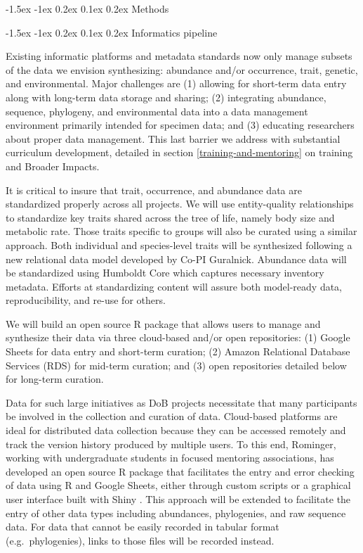 \documentclass[11pt]{article}
\makeatletter
\renewcommand\subsection{\@startsection{subsection}{1}{\z@}%
                                  {-1.5ex \@plus -1ex \@minus 0.2ex}%
                                  {0.1ex \@plus 0.2ex}%
                                  {\normalfont\large\bfseries}}
\renewcommand\subsubsection{\@startsection{subsection}{1}{\z@}%
                                  {-1.5ex \@plus -1ex \@minus 0.2ex}%
                                  {0.1ex \@plus 0.2ex}%
                                  {\normalfont\bfseries}}
\makeatother
\begin{document}
\subsection{Methods}\label{methods}

\subsubsection{Informatics pipeline}\label{informatics-pipeline}

Existing informatic platforms and metadata standards now only manage
subsets of the data we envision synthesizing: abundance and/or
occurrence, trait, genetic, and environmental. Major challenges are
(1) allowing for short-term data entry along with long-term data
storage and sharing; (2) integrating abundance, sequence, phylogeny,
and environmental data into a data management environment primarily
intended for specimen data; and (3) educating researchers about proper
data management. This last barrier we address with substantial
curriculum development, detailed in section
\ref{training-and-mentoring} on training and Broader Impacts.

It is critical to insure that trait, occurrence, and abundance data
are standardized properly across all projects. We will use
entity-quality relationships to standardize key traits shared across
the tree of life, namely body size and metabolic rate. Those traits
specific to groups will also be curated using a similar approach. Both
individual and species-level traits will be synthesized following a
new relational data model developed by Co-PI Guralnick.  Abundance
data will be standardized using Humboldt Core \cite{Guralnick2017-xb}
which captures necessary inventory metadata. Efforts at standardizing
content will assure both model-ready data, reproducibility, and re-use
for others.

We will build an open source R package that allows users to manage and
synthesize their data via three cloud-based and/or open repositories:
(1) Google Sheets for data entry and short-term curation; (2) Amazon
Relational Database Services (RDS) for mid-term curation; and (3) open
repositories detailed below for long-term curation.

Data for such large initiatives as DoB projects necessitate that many
participants be involved in the collection and curation of data.
Cloud-based platforms are ideal for distributed data collection because
they can be accessed remotely and track the version history produced by
multiple users. To this end, Rominger, working with undergraduate
students in focused mentoring associations, has developed an open source
R package \cite{Rominger2016-mq} that facilitates the entry and error
checking of data using R and Google Sheets, either through custom
scripts or a graphical user interface built with Shiny
\cite{RStudio_Inc2013-bt}. This approach will be extended to facilitate
the entry of other data types including abundances, phylogenies, and raw
sequence data. For data that cannot be easily recorded in tabular format
(e.g.~phylogenies), links to those files will be recorded instead.
\end{document}
